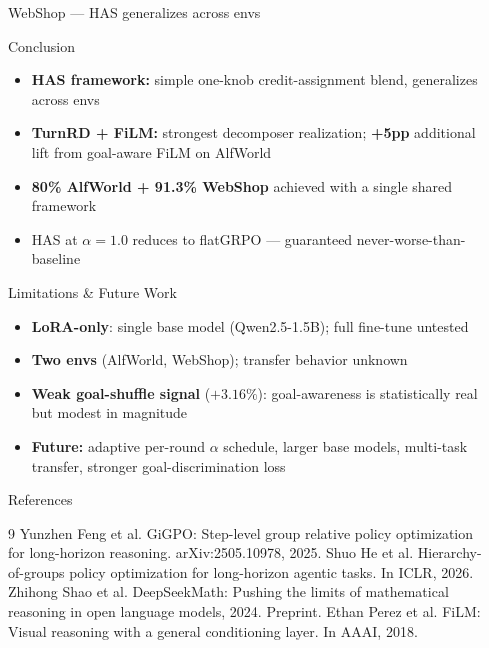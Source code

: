 \documentclass[final]{beamer}
\newlength{\sepwidth}
\newlength{\colwidth}
\newcommand{\separatorcolumn}{\begin{column}{\sepwidth}\end{column}}
\begin{document}
\begin{frame}[t]
\begin{columns}[t]
\begin{column}{\colwidth}
\begin{block}{WebShop --- HAS generalizes across envs}
  \end{block}

  \begin{block}{Conclusion}

    \begin{itemize}
      \item \textbf{HAS framework:} simple one-knob credit-assignment blend, generalizes across envs
      \item \textbf{TurnRD + FiLM:} strongest decomposer realization;
            \textbf{+5pp} additional lift from goal-aware FiLM on AlfWorld
      \item \textbf{80\% AlfWorld + 91.3\% WebShop} achieved with a single shared framework
      \item HAS at $\alpha = 1.0$ reduces to flatGRPO --- guaranteed never-worse-than-baseline
    \end{itemize}

  \end{block}

  \begin{block}{Limitations \& Future Work}

    \begin{itemize}
      \item \textbf{LoRA-only}: single base model (Qwen2.5-1.5B); full fine-tune untested
      \item \textbf{Two envs} (AlfWorld, WebShop); transfer behavior unknown
      \item \textbf{Weak goal-shuffle signal} ($+3.16\%$): goal-awareness is statistically real but modest in magnitude
      \item \textbf{Future:} adaptive per-round $\alpha$ schedule, larger base models,
            multi-task transfer, stronger goal-discrimination loss
    \end{itemize}

  \end{block}

  \begin{block}{References}

    \footnotesize
    \begin{thebibliography}{9}
      \setlength{\itemsep}{0.3em}
       Yunzhen Feng et al. GiGPO: Step-level group relative policy optimization for long-horizon reasoning. arXiv:2505.10978, 2025.
       Shuo He et al. Hierarchy-of-groups policy optimization for long-horizon agentic tasks. In ICLR, 2026.
       Zhihong Shao et al. DeepSeekMath: Pushing the limits of mathematical reasoning in open language models, 2024. Preprint.
       Ethan Perez et al. FiLM: Visual reasoning with a general conditioning layer. In AAAI, 2018.
    \end{thebibliography}

  \end{block}

\end{column}

\separatorcolumn
\end{columns}
\end{frame}
\end{document}
